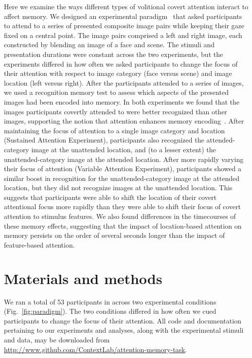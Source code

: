 \documentclass[english]{article}
\begin{document}
Here we examine the ways different types of volitional covert attention
interact to affect memory. We designed an experimental
paradigm~\citep[following][]{Posn80} that asked participants to attend to a
series of presented composite image pairs while keeping their gaze fixed on a
central point. The image pairs comprised a left and right image, each
constructed by blending an image of a face and scene. The stimuli and
presentation durations were constant across the two experiments, but the
experiments differed in how often we asked participants to change the focus of
their attention with respect to image category (face versus scene) and image
location (left versus right). After the participants attended to a series of
images, we used a recognition memory test to assess which aspects of the
presented images had been encoded into memory. In both experiments we found
that the images participants covertly attended to were better recognized than
other images, supporting the notion that attention enhances memory
encoding~\citep[i.e., they rated attended images as more familiar than
unattended images][]{Yone02}. After maintaining the focus of attention to a
single image category and location (Sustained Attention Experiment),
participants also recognized the attended-category image at the unattended
location, and (to a lesser extent) the unattended-category image at the
attended location. After more rapidly varying their focus of attention
(Variable Attention Experiment), participants showed a similar boost in
recognition for the unattended-category image at the attended location, but
they did not recognize images at the unattended location. This suggests that
participants were able to shift the location of their covert attentional focus
more rapidly than they were able to shift their focus of covert attention to
stimulus features. We also found differences in the timecourses of these memory
effects, suggesting that the impact of location-based attention on memory
persists on the order of several seconds longer than the impact of
feature-based attention.

\section*{Materials and methods}

We ran a total of 53 participants in across two experimental conditions
(Fig.~\ref{fig:paradigm}). The two conditions differed in how often we
cued participants to change the focus of their attention. All code and
documentation pertaining to our experiments and analyses, along with the
experimental stimuli and data, may be downloaded from
\url{http://www.github.com/ContextLab/attention-memory-task}.
\end{document}
